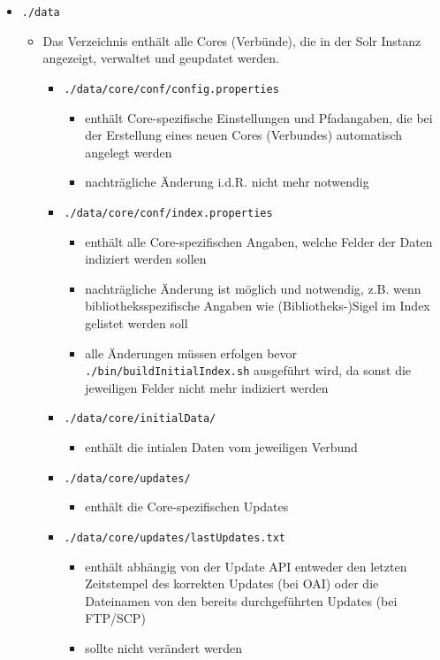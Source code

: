 \documentclass[10pt]{article}
\begin{document}
\begin{itemize}
	\item[] \texttt{./data}
	\begin{itemize}
		\item Das Verzeichnis enthält alle Cores (Verbünde), die in der Solr Instanz angezeigt, verwaltet und geupdatet werden.
		\begin{itemize}
			\item[] \texttt{./data/core/conf/config.properties}	
			\begin{itemize}
				\item enthält Core-spezifische Einstellungen und Pfadangaben, die bei der Erstellung eines neuen Cores (Verbundes) automatisch angelegt werden
				\item nachträgliche Änderung i.d.R. nicht mehr notwendig				
			\end{itemize}					
		\end{itemize}
		\begin{itemize}
			\item[] \texttt{./data/core/conf/index.properties}	
			\begin{itemize}
				\item enthält alle Core-spezifischen Angaben, welche Felder der Daten indiziert werden sollen
				\item nachträgliche Änderung ist möglich und notwendig, z.B. wenn bibliotheksspezifische Angaben wie (Bibliotheks-)Sigel im Index gelistet werden soll
				\item alle Änderungen müssen erfolgen bevor \texttt{./bin/buildInitialIndex.sh} ausgeführt wird, da sonst die jeweiligen Felder nicht mehr indiziert werden
			\end{itemize}					
		\end{itemize}
		\begin{itemize}
			\item[] \texttt{./data/core/initialData/}	
			\begin{itemize}
				\item enthält die intialen Daten vom jeweiligen Verbund
			\end{itemize}					
		\end{itemize}
		\begin{itemize}
			\item[] \texttt{./data/core/updates/}	
			\begin{itemize}
				\item enthält die Core-spezifischen Updates
			\end{itemize}					
		\end{itemize}
		\begin{itemize}
			\item[] \texttt{./data/core/updates/lastUpdates.txt}	
			\begin{itemize}
				\item enthält abhängig von der Update API entweder den letzten Zeitstempel des korrekten Updates (bei OAI) oder die Dateinamen von den bereits durchgeführten Updates (bei FTP/SCP)
				\item sollte nicht verändert werden
			\end{itemize}					
		\end{itemize}
	\end{itemize}


\end{itemize}
\end{document}
